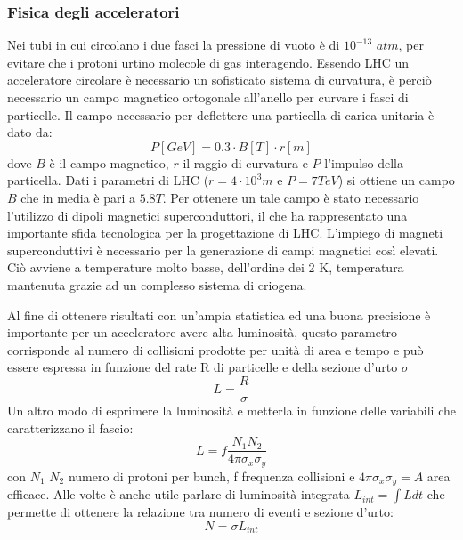 \subsubsection{Fisica degli acceleratori}

Nei tubi in cui circolano i due fasci la pressione di vuoto è di $10^{-13}$ $atm$, per evitare che i protoni urtino molecole di gas interagendo. 
Essendo LHC un acceleratore circolare è necessario un sofisticato sistema di curvatura, è perciò necessario un campo magnetico ortogonale  all'anello per curvare i fasci di particelle. 
Il campo necessario per deflettere una particella di carica unitaria è dato da:
\begin{equation}
P[GeV]= 0.3 \cdot B[T] \cdot r[m]
\end{equation}
dove $B$ è il campo magnetico, $r$ il raggio di curvatura e $P$ l'impulso della particella. Dati i parametri di LHC ($r= 4 \cdot 10^3 m$ e $P=7 TeV$) si ottiene un campo $B$ che in media è pari a $5.8 T$. Per ottenere un tale campo è stato necessario l'utilizzo di dipoli magnetici superconduttori, il che ha rappresentato una importante sfida tecnologica per la progettazione di LHC. L'impiego di magneti superconduttivi è necessario per la generazione di campi magnetici così elevati. Ciò avviene a temperature molto basse, dell'ordine dei 2 K, temperatura mantenuta grazie ad un complesso sistema di criogena.

Al fine di ottenere risultati con un'ampia statistica ed una buona precisione è importante per un acceleratore avere alta luminosità, questo parametro corrisponde al numero di collisioni prodotte per unità di area e tempo e può essere espressa in funzione del rate R di particelle e della sezione d'urto $\sigma$ 
\begin{equation}
L=\frac{R}{\sigma}
\end{equation}
Un altro modo di esprimere la luminosità e metterla in funzione delle variabili che caratterizzano il fascio:
\begin{equation}
L = f \frac{N_1 N_2}{4 \pi \sigma_x \sigma_y}
\end{equation}
con $N_1$ $N_2$ numero di protoni per bunch, f frequenza collisioni e $4\pi \sigma_x \sigma_y =A$ area efficace. Alle volte è anche utile parlare di luminosità integrata $L_{int}=\int L dt$ che permette di ottenere la relazione tra numero di eventi e sezione d'urto:
\begin{equation}
N=\sigma L_{int}
\end{equation}

